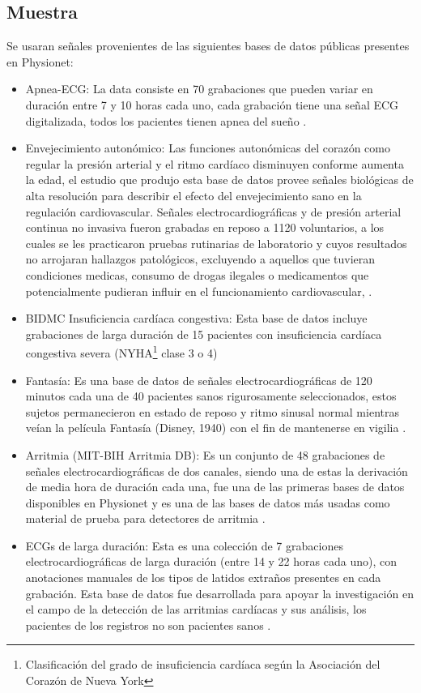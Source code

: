 \documentclass[12pt,letterpaper,oneside,openright]{book}
\begin{document}
\subsection{Muestra} \label{subsec:muestra}
Se usaran señales provenientes de las siguientes bases de datos públicas presentes en Physionet: 
\begin{itemize}
	\item Apnea-ECG: La data consiste en 70 grabaciones que pueden variar en duración entre 7 y 10 horas cada uno, cada grabación tiene una señal ECG digitalizada, todos los pacientes tienen apnea del sueño \cite{apneaDB}. 
	\item Envejecimiento autonómico: Las funciones autonómicas del corazón como regular la presión arterial y el ritmo cardíaco disminuyen conforme aumenta la edad, el estudio que produjo esta base de datos provee señales biológicas de alta resolución para describir el efecto del envejecimiento sano en la regulación cardiovascular. Señales electrocardiográficas y de presión arterial continua no invasiva fueron grabadas en reposo a 1120 voluntarios, a los cuales se les practicaron pruebas rutinarias de laboratorio y cuyos resultados no arrojaran hallazgos patológicos, excluyendo a aquellos que tuvieran condiciones medicas, consumo de drogas ilegales o medicamentos que potencialmente pudieran influir en el funcionamiento cardiovascular, \cite{autonomicAgingDB}.
	\item BIDMC Insuficiencia cardíaca congestiva: Esta base de datos incluye grabaciones de larga duración de 15 pacientes con insuficiencia cardíaca congestiva severa (NYHA\footnote{Clasificación del grado de insuficiencia cardíaca según la Asociación del Corazón de Nueva York} clase 3 o 4) \cite{InsuficienciaCardiacaDB}
	\item Fantasía: Es una base de datos de señales electrocardiográficas de 120 minutos cada una de 40 pacientes sanos rigurosamente seleccionados, estos sujetos permanecieron en estado de reposo y ritmo sinusal normal mientras veían la película Fantasía (Disney, 1940) con el fin de mantenerse en vigilia \cite{fantasiaDB}.
	\item Arritmia (MIT-BIH Arritmia DB): Es un conjunto de 48 grabaciones de señales electrocardiográficas de dos canales, siendo una de estas la derivación  de media hora de duración cada una, fue una de las primeras bases de datos disponibles en Physionet y es una de las bases de datos más usadas como material de prueba para detectores de arritmia \cite{arritmiadb}. 
	\item ECGs de larga duración: Esta es una colección de 7 grabaciones electrocardiográficas de larga duración (entre 14 y 22 horas cada uno), con anotaciones manuales de los tipos de latidos extraños presentes en cada grabación. Esta base de datos fue desarrollada para apoyar la investigación en el campo de la detección de las arritmias cardíacas y sus análisis, los pacientes de los registros no son pacientes sanos \cite{longtermdb}.

\end{itemize}
\end{document}
